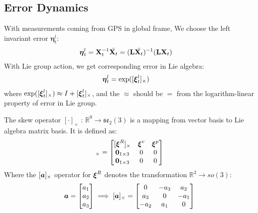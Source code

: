 \subsection{Error Dynamics}

With measurements coming from GPS in global frame, We choose the left invariant error $\mathbf{\eta}^l_t$:
\begin{align*}
    & \boldsymbol{\eta}^l_t = \textbf{X}_t^{-1}\Bar{\textbf{X}_t} = (\textbf{L}\Bar{\textbf{X}_t})^{-1}(\textbf{L}\textbf{X}_t)
\end{align*}
With Lie group action, we get corresponding error in Lie algebra:
\begin{align}
    & \boldsymbol{\eta}^l_t = \exp([\boldsymbol{\xi}^l_t]_{\times})
\end{align}
where $\exp([\boldsymbol{\xi}^l_t]_{\times})\approx I + [\boldsymbol{\xi}^l_t]_{\times}$, and the $\approx$ should be $=$ from the logarithm-linear property of error in Lie group.

The skew operator $[\cdot]_\times$ :  $\mathbb{R}^9 \rightarrow \mathfrak{se}_2(3)$ is a mapping from vector basis to Lie algebra matrix basis. It is defined as:
\begin{equation}
    [\mat{\xi}]_\times = 
    \begin{bmatrix}
    [\mat{\xi}^R]_\times & \mat{\xi}^v & \mat{\xi}^p \\
    \mat{0}_{1 \times 3} & 0 & 0 \\
    \mat{0}_{1 \times 3} & 0 & 0 \\
    \end{bmatrix}
\end{equation}
Where the $[\boldsymbol{a}]_\times$ operator for $\boldsymbol{\xi}^R$ denotes the transformation $\mathbb{R}^3 \rightarrow so(3)$:
\begin{equation}
    \boldsymbol{a} =  
    \begin{bmatrix}
        a_1 \\ a_2 \\ a_3 
    \end{bmatrix} \implies
    [\boldsymbol{a}]_\times = 
    \begin{bmatrix}
        0 & -a_3 & a_2 \\
        a_3 & 0 & -a_1 \\
        -a_2 & a_1 & 0 \\
    \end{bmatrix}
\end{equation}

